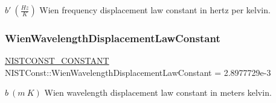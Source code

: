 $b' \ (\frac{Hz}{K})$ Wien frequency displacement law constant in hertz per kelvin. \mbox{\label{group___n_i_s_t_const-_wien_displacement_gaad844adb8bf7d8300587cb2892b430d8}} 
\subsubsection{\texorpdfstring{Wien\+Wavelength\+Displacement\+Law\+Constant}{WienWavelengthDisplacementLawConstant}}
{\footnotesize\ttfamily \mbox{\hyperlink{group___n_i_s_t_const-_macros_ga2b0fc1d7452373f816175dd86ce26729}{N\+I\+S\+T\+C\+O\+N\+S\+T\+\_\+\+C\+O\+N\+S\+T\+A\+NT}} N\+I\+S\+T\+Const\+::\+Wien\+Wavelength\+Displacement\+Law\+Constant = 2.\+8977729e-\/3}

$b \ (m\ K)$ Wien wavelength displacement law constant in meters kelvin. 